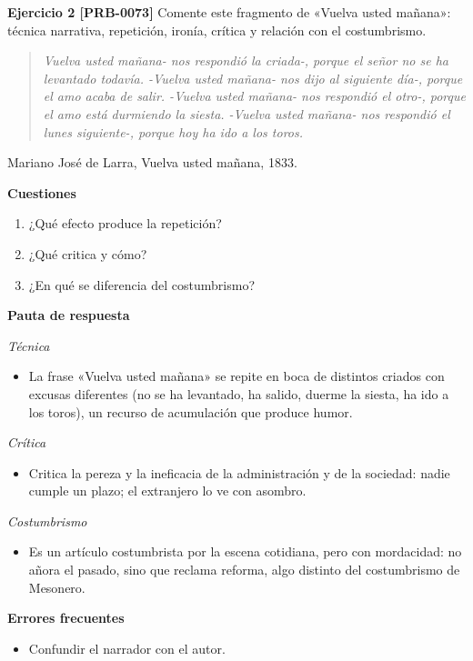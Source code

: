 \documentclass{book}
\begin{document}
\noindent\textbf{Ejercicio 2 [PRB-0073]}
Comente este fragmento de «Vuelva usted mañana»: técnica narrativa, repetición, ironía, crítica y relación con el costumbrismo.


\begin{quote}
\itshape Vuelva usted mañana- nos respondió la criada-, porque el señor no se ha levantado todavía. -Vuelva usted mañana- nos dijo al siguiente día-, porque el amo acaba de salir. -Vuelva usted mañana- nos respondió el otro-, porque el amo está durmiendo la siesta. -Vuelva usted mañana- nos respondió el lunes siguiente-, porque hoy ha ido a los toros.
\end{quote}
{\noindent\footnotesize Mariano José de Larra, Vuelva usted mañana, 1833.\par}

\noindent\textbf{Cuestiones}
\begin{enumerate}
\item ¿Qué efecto produce la repetición?
\item ¿Qué critica y cómo?
\item ¿En qué se diferencia del costumbrismo?
\end{enumerate}

\noindent\textbf{Pauta de respuesta}

\noindent\textit{Técnica}
\begin{itemize}
\item La frase «Vuelva usted mañana» se repite en boca de distintos criados con excusas diferentes (no se ha levantado, ha salido, duerme la siesta, ha ido a los toros), un recurso de acumulación que produce humor.
\end{itemize}

\noindent\textit{Crítica}
\begin{itemize}
\item Critica la pereza y la ineficacia de la administración y de la sociedad: nadie cumple un plazo; el extranjero lo ve con asombro.
\end{itemize}

\noindent\textit{Costumbrismo}
\begin{itemize}
\item Es un artículo costumbrista por la escena cotidiana, pero con mordacidad: no añora el pasado, sino que reclama reforma, algo distinto del costumbrismo de Mesonero.
\end{itemize}

\noindent\textbf{Errores frecuentes}
\begin{itemize}
\item Confundir el narrador con el autor.
\end{itemize}
\end{document}
